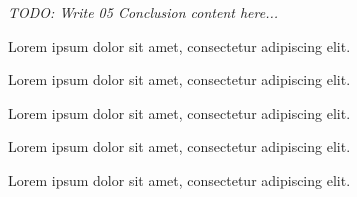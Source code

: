 \textit{TODO: Write 05 Conclusion content here...}
\par Lorem ipsum dolor sit amet, consectetur adipiscing elit. \par Lorem ipsum dolor sit amet, consectetur adipiscing elit. \par Lorem ipsum dolor sit amet, consectetur adipiscing elit. \par Lorem ipsum dolor sit amet, consectetur adipiscing elit. \par Lorem ipsum dolor sit amet, consectetur adipiscing elit. 
